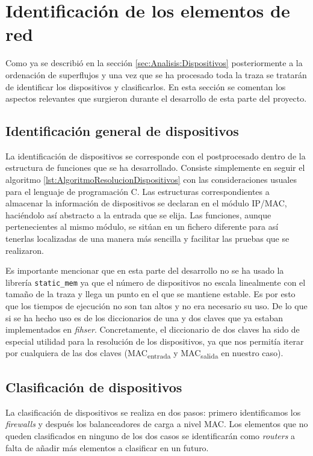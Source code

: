 \documentclass[tfg,epsbased,lof,lot,loa,final,nocopyright,overleaf]{tfgtfmthesisuam}
\begin{document}
\section{Identificación de los elementos de red}
Como ya se describió en la sección \ref{sec:Analisis:Dispositivos} posteriormente a la ordenación de superflujos y una vez que se ha procesado toda la traza se tratarán de identificar los dispositivos y clasificarlos. En esta sección se comentan los aspectos relevantes que surgieron durante el desarrollo de esta parte del proyecto.

\subsection{Identificación general de dispositivos}
La identificación de dispositivos se corresponde con el postprocesado dentro de la estructura de funciones que se ha desarrollado. Consiste simplemente en seguir el algoritmo \ref{lst:AlgoritmoResolucionDispositivos} con las consideraciones usuales para el lenguaje de programación C. Las estructuras correspondientes a almacenar la información de dispositivos se declaran en el módulo IP/MAC, haciéndolo así abstracto a la entrada que se elija. Las funciones, aunque pertenecientes al mismo módulo, se sitúan en un fichero diferente para así tenerlas localizadas de una manera más sencilla y facilitar las pruebas que se realizaron.

Es importante mencionar que en esta parte del desarrollo no se ha usado la librería \texttt{static\_mem} ya que el número de dispositivos no escala linealmente con el tamaño de la traza y llega un punto en el que se mantiene estable. Es por esto que los tiempos de ejecución no son tan altos y no era necesario su uso. De lo que si se ha hecho uso es de los diccionarios de una y dos claves que ya estaban implementados en \textit{fihser}. Concretamente, el diccionario de dos claves ha sido de especial utilidad para la resolución de los dispositivos, ya que nos permitía iterar por cualquiera de las dos claves (MAC\textsubscript{entrada} y MAC\textsubscript{salida} en nuestro caso).

\subsection{Clasificación de dispositivos}
La clasificación de dispositivos se realiza en dos pasos: primero identificamos los \textit{firewalls} y después los balanceadores de carga a nivel MAC. Los elementos que no queden clasificados en ninguno de los dos casos se identificarán como \textit{routers} a falta de añadir más elementos a clasificar en un futuro.
\end{document}

